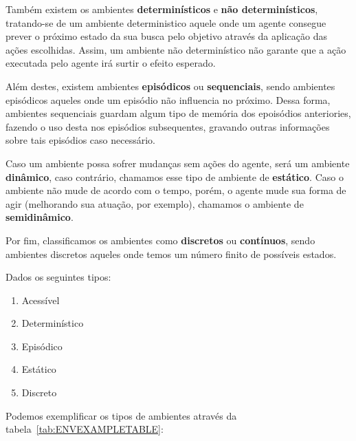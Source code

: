 Também existem os ambientes \textbf{determinísticos} e \textbf{não
determinísticos}, tratando-se de um ambiente deterministico aquele onde um
agente consegue prever o próximo estado da sua busca pelo objetivo através da
aplicação das ações escolhidas. Assim, um ambiente não determinístico não
garante que a ação executada pelo agente irá surtir o efeito esperado.

Além destes, existem ambientes \textbf{episódicos} ou \textbf{sequenciais},
sendo ambientes episódicos aqueles onde um episódio não influencia no próximo.
Dessa forma, ambientes sequenciais guardam algum tipo de memória dos epoisódios
anteriories, fazendo o uso desta nos episódios subsequentes, gravando outras
informações sobre tais episódios caso necessário.

Caso um ambiente possa sofrer mudanças sem ações do agente, será um ambiente
\textbf{dinâmico}, caso contrário, chamamos esse tipo de ambiente de
\textbf{estático}. Caso o ambiente não mude de acordo com o tempo, porém, o
agente mude sua forma de agir (melhorando sua atuação, por exemplo), chamamos
o ambiente de \textbf{semidinâmico}.

Por fim, classificamos os ambientes como \textbf{discretos} ou
\textbf{contínuos}, sendo ambientes discretos aqueles onde temos um número
finito de possíveis estados.

Dados os seguintes tipos:

\begin{enumerate}
    \item Acessível
    \item Determinístico
    \item Episódico
    \item Estático
    \item Discreto
\end{enumerate}

Podemos exemplificar os tipos de ambientes através da
tabela~\ref{tab:ENVEXAMPLETABLE}:


